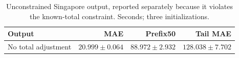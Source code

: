 \begin{table}[t]
\centering\footnotesize\setlength{\tabcolsep}{4pt}
\caption{Unconstrained Singapore output, reported separately because it violates the known-total constraint. Seconds; three initializations.}\label{tab:singapore_unconstrained}
\begin{tabular}{lrrr}\toprule
Output & MAE & Prefix50 & Tail MAE\\\midrule
No total adjustment & $20.999\pm0.064$ & $88.972\pm2.932$ & $128.038\pm7.702$\\
\bottomrule\end{tabular}
\end{table}
